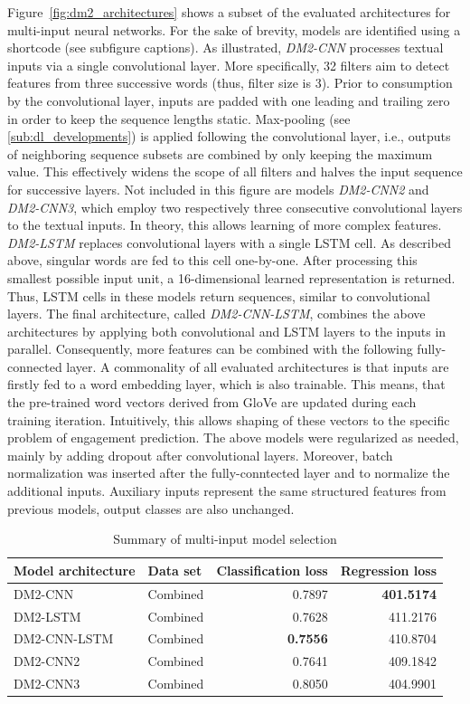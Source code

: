 Figure~\ref{fig:dm2_architectures} shows a subset of the evaluated architectures for
multi-input neural networks.
For the sake of brevity, models are identified using a shortcode (see subfigure captions).
As illustrated, \textit{DM2-CNN} processes textual inputs via a single convolutional
layer.
More specifically, 32 filters aim to detect features from three successive words
(thus, filter size is 3).
Prior to consumption by the convolutional layer, inputs are padded with one leading
and trailing zero in order to keep the sequence lengths static.
Max-pooling (see \ref{sub:dl_developments}) is applied following the convolutional layer,
i.e., outputs of neighboring sequence subsets are combined by only keeping the
maximum value.
This effectively widens the scope of all filters and halves the input sequence
for successive layers.
Not included in this figure are models \textit{DM2-CNN2} and \textit{DM2-CNN3},
which employ two respectively three consecutive convolutional layers to the
textual inputs.
In theory, this allows learning of more complex features.
\textit{DM2-LSTM} replaces convolutional layers with a single LSTM cell.
As described above, singular words are fed to this cell one-by-one.
After processing this smallest possible input unit, a 16-dimensional learned
representation is returned.
Thus, LSTM cells in these models return sequences, similar to convolutional layers.
The final architecture, called \textit{DM2-CNN-LSTM}, combines the above
architectures by applying both convolutional and LSTM layers to the inputs
in parallel.
Consequently, more features can be combined with the following fully-connected
layer.
A commonality of all evaluated architectures is that inputs are firstly fed to
a word embedding layer, which is also trainable.
This means, that the pre-trained word vectors derived from GloVe are updated
during each training iteration.
Intuitively, this allows shaping of these vectors to the specific problem of
engagement prediction.
The above models were regularized as needed, mainly by adding dropout after
convolutional layers.
Moreover, batch normalization was inserted after the fully-conntected layer and
to normalize the additional inputs.
Auxiliary inputs represent the same structured features from previous models,
output classes are also unchanged.

\begin{table}
\begin{tabular}{llrr}
\toprule
Model architecture & Data set & Classification loss & Regression loss \\
\midrule
DM2-CNN & Combined & 0.7897 & \textbf{401.5174} \\
DM2-LSTM & Combined & 0.7628 & 411.2176 \\
DM2-CNN-LSTM & Combined & \textbf{0.7556} & 410.8704 \\
DM2-CNN2 & Combined & 0.7641 & 409.1842 \\
DM2-CNN3 & Combined & 0.8050 & 404.9901 \\
\bottomrule
\end{tabular}
\caption{Summary of multi-input model selection}
\label{tab:dm2_selection_results}
\end{table}

